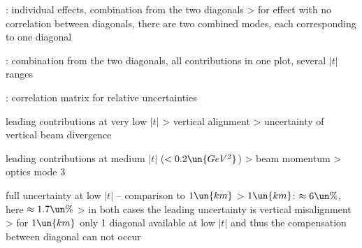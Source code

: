 \>  : individual effects, combination from the two diagonals
\>> for effect with no correlation between diagonals, there are two combined modes, each corresponding to one diagonal

\>  : combination from the two diagonals, all contributions in one plot, several $|t|$ ranges

\>  : correlation matrix for relative uncertainties

\> leading contributions at very low $|t|$
\>> vertical alignment
\>> uncertainty of vertical beam divergence

\> leading contributions at medium $|t|$ ($< 0.2\un{GeV^2}$)
\>> beam momentum
\>> optics mode 3

\> full uncertainty at low $|t|$ -- comparison to $1\un{km}$
\>> $1\un{km}$: $\approx 6\un{\%}$, here $\approx 1.7\un{\%}$
\>> in both cases the leading uncertainty is vertical misalignment
\>> for $1\un{km}$ only 1 diagonal available at low $|t|$ and thus the compensation between diagonal can not occur

\fi



\EndText
\bye
